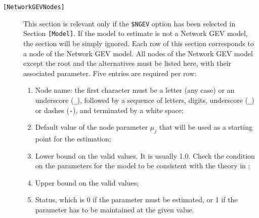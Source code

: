 \documentclass[12pt,a4paper]{article}
\newcommand{\specitem}[1]{\texttt{[#1]}}
\begin{document}
\begin{description}
   \item[\specitem{NetworkGEVNodes}] This section is relevant only if the
      \verb+$NGEV+ option has been selected in Section
      \verb+[Model]+. If the model to estimate is not a Network GEV model, the section
      will be simply ignored.  Each row of this section corresponds to a node of the
      Network GEV model.
      All nodes of the
      Network GEV model except the root and the alternatives must be listed here,
      with their associated parameter.
       Five entries are required per row: 
      \begin{enumerate}
         \item Node name:   the first character must be a letter (any case) or an underscore
            (\verb+_+), followed by a sequence of letters, digits, underscore (\verb+_+)
            or dashes (\verb+-+), and terminated by a white space;
         \item Default value of the node parameter $\mu_j$ that will be used as a starting point for the estimation;
         \item Lower bound on the valid values. It is usually 1.0. Check the condition
            on the parameters for the model to be consistent with the theory in ;
         \item Upper bound on the valid values;
         \item Status, which is 0 if the parameter must be estimated, or 1 if the parameter has to be maintained at the given value. 
      \end{enumerate}


\end{description}
\end{document}

